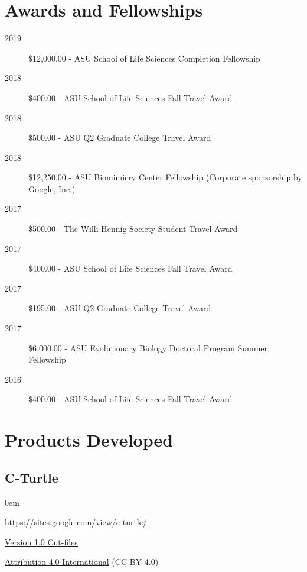 \documentclass[12pt,a4paper]{article}
\begin{document}
\section*{Awards and Fellowships}
	\begin{description}
		\item [2019] \$12,000.00 - ASU School of Life Sciences Completion Fellowship
		\item [2018] \$400.00 - ASU School of Life Sciences Fall Travel Award
		\item [2018] \$500.00 - ASU Q2 Graduate College Travel Award
		\item [2018] \$12,250.00 - ASU Biomimicry Center Fellowship (Corporate sponsorship by Google, Inc.)
		\item [2017] \$500.00 - The Willi Hennig Society Student Travel Award
		\item [2017] \$400.00 - ASU School of Life Sciences Fall Travel Award
		\item [2017] \$195.00 - ASU Q2 Graduate College Travel Award
		\item [2017] \$6,000.00 - ASU Evolutionary Biology Doctoral Program Summer Fellowship
		\item [2016] \$400.00 - ASU School of Life Sciences Fall Travel Award
	\end{description}

\section*{Products Developed}
	\subsection*{C-Turtle}
		\begin{description}
			\itemsep0em
			\item[Website] \href{https://sites.google.com/view/c-turtle/}{https://sites.google.com/view/c-turtle/}
			\item[Design] \href{https://drive.google.com/file/d/0BxntR7XVPIVqekR3Sjcyd1hkUm8/view}{Version 1.0 Cut-files}
			\item[License] \href{https://creativecommons.org/licenses/by/4.0/}{Attribution 4.0 International} (CC BY 4.0)
		\end{description}
\end{document}
